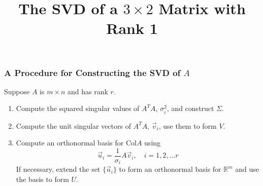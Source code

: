 \title{The SVD of a $3\times2$ Matrix with Rank 1}
\subtitle{\SubTitleName}
\institute[]{\Course}
\author{\Instructor}
\maketitle   



\begin{frame}\frametitle{A Procedure for Constructing the SVD of $A$}
    Suppose $A$ is $m \times n$ and has rank $r$. 
    
    \begin{enumerate}
        \item<2-> Compute the squared singular values of $A^TA$, $\sigma_i^2$, and construct $\Sigma$. \vspace{6pt}
        \item<3-> Compute the unit singular vectors of $A^TA$, $\vec v_i$, use them to form $V$. \vspace{6pt}
        \item<4-> Compute an orthonormal basis for Col$A$ using $$\vec u_i = \frac{1}{\sigma_i}A\vec v_i, \quad i = 1, 2, \ldots r$$ If necessary, extend the set $\{\vec u_i\}$ to form an orthonormal basis for $\mathbb R^m$ and use the basis to form $U$. 
    
    \end{enumerate}
\end{frame}




